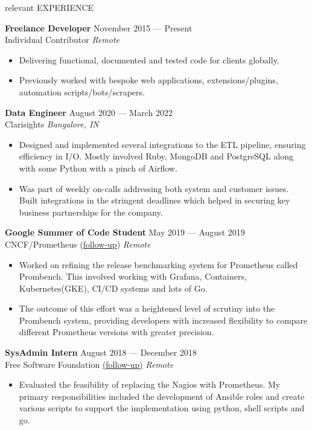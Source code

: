 \documentclass{resume} %
\begin{document}
\begin{rSection}{relevant EXPERIENCE}

  \textbf{Freelance Developer} \hfill November 2015 — Present\\
  Individual Contributor \hfill \textit{Remote}
  \begin{itemize}
    \itemsep -3pt {}
    \item Delivering functional, documented and tested code for clients globally.
    \item Previously worked with bespoke web applications, extensions/plugins, automation scripts/bots/scrapers.
  \end{itemize}

  \textbf{Data Engineer} \hfill August 2020 — March 2022\\
  Clarisights \hfill \textit{Bangalore, IN}
  \begin{itemize}
    \itemsep -3pt {}
    \item Designed and implemented several integrations to the ETL pipeline, ensuring efficiency in I/O. Mostly involved Ruby, MongoDB and PostgreSQL along with some Python with a pinch of Airflow.
    \item Was part of weekly on-calls addressing both system and customer issues. Built integrations in the stringent deadlines which helped in securing key business partnerships for the company.
  \end{itemize}

  \textbf{Google Summer of Code Student} \hfill May 2019 — August 2019\\
  CNCF/Prometheus (\href{https://blog.geekodour.org/posts/gsoc19/}{follow-up}) \hfill \textit{Remote}
  \begin{itemize}
    \itemsep -3pt {}
    \item Worked on refining the release benchmarking system for Prometheus called Prombench. This involved working with Grafana, Containers, Kubernetes(GKE), CI/CD systems and lots of Go.
    \item The outcome of this effort was a heightened level of scrutiny into the Prombench system, providing developers with increased flexibility to compare different Prometheus versions with greater precision.
  \end{itemize}

  \textbf{SysAdmin Intern} \hfill August 2018 — December 2018\\
  Free Software Foundation \href{https://www.fsf.org/blogs/sysadmin/what-i-learned-during-my-internship-with-the-fsf-tech-team}{(follow-up)} \hfill \textit{Remote}
  \begin{itemize}
    \itemsep -3pt {}
    \item Evaluated the feasibility of replacing the Nagios with Prometheus. My primary responsibilities included the development of Ansible roles and create various scripts to support the implementation using python, shell scripts and go.
  \end{itemize}
\end{rSection}
\end{document}
